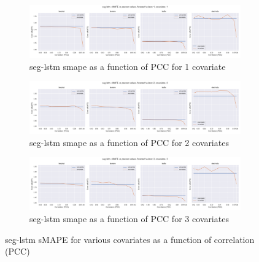 \documentclass{article}
\begin{document}
\begin{figure}[ht]
\begin{subfigure}{\textwidth}
\centering
\includegraphics[width=\textwidth]{figures/seg_k1_pe_pcc.png}
\caption{seg-lstm smape as a function of PCC for 1 covariate}
\label{fig:seg_lstm_k_1_smape_vs_pearson}
\end{subfigure}
\begin{subfigure}{\textwidth}
\centering
\includegraphics[width=\textwidth]{figures/seg_k2_pe_pcc.png}
\caption{seg-lstm smape as a function of PCC for 2 covariates}
\label{fig:seg_lstm_k_2_smape_vs_pearson}
\end{subfigure}
\begin{subfigure}{\textwidth}
\centering
\includegraphics[width=\textwidth]{figures/seg_k3_pe_pcc.png}
\caption{seg-lstm smape as a function of PCC for 3 covariates}
\label{fig:seg_lstm_k_3_smape_vs_pearson}
\end{subfigure}
\caption{seg-lstm sMAPE for various covariates as a function of correlation (PCC)}
\label{fig:seg_lstm_smape_vs_pearson}
\end{figure}
\end{document}
